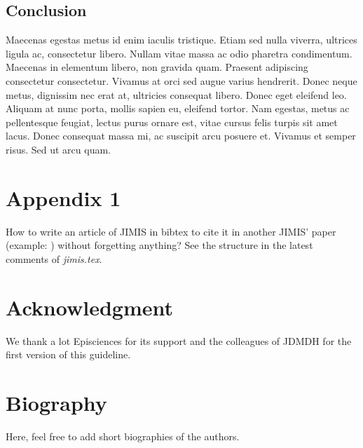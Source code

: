 \documentclass[jimisdraft]{jimis-en}
\begin{document}
\subsection{Conclusion}
Maecenas egestas metus id enim iaculis tristique. Etiam sed nulla viverra, ultrices ligula ac, consectetur libero. Nullam vitae massa ac odio pharetra condimentum. Maecenas in elementum libero, non gravida quam. Praesent adipiscing consectetur consectetur. Vivamus at orci sed augue varius hendrerit. Donec neque metus, dignissim nec erat at, ultricies consequat libero. Donec eget eleifend leo. Aliquam at nunc porta, mollis sapien eu, eleifend tortor. Nam egestas, metus ac pellentesque feugiat, lectus purus ornare est, vitae cursus felis turpis sit amet lacus. Donec consequat massa mi, ac suscipit arcu posuere et. Vivamus et semper risus. Sed ut arcu quam.



















\appendix\footnotesize

\section{Appendix 1}
How to write an article of JIMIS in bibtex to cite it in another JIMIS' paper (example: \citet{jimis}) without forgetting anything? See the structure in the latest comments of \textit{jimis.tex}.





\section{Acknowledgment}
We thank a lot Episciences for its support and the colleagues of JDMDH for the first version of this guideline.





\section{Biography}
Here, feel free to add short biographies of the authors.
\end{document}
